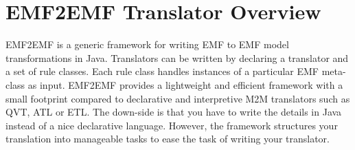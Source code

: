 \section{EMF2EMF Translator Overview}
\label{sec:overview}

EMF2EMF is a generic framework for writing EMF to EMF model transformations in Java. Translators can be written by declaring a translator and a set of rule classes. Each rule class handles instances of a particular EMF meta-class as input. EMF2EMF provides a lightweight and efficient framework with a small footprint compared to declarative and interpretive M2M translators such as QVT, ATL or ETL. The down-side is that you have to write the details in Java instead of a nice declarative language. However, the framework structures your translation into manageable tasks to ease the task of writing your translator.


